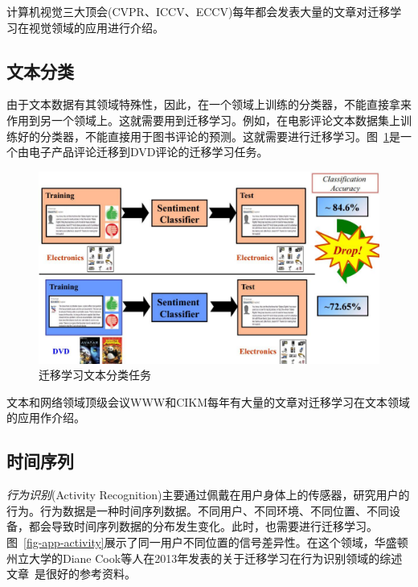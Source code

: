 计算机视觉三大顶会(CVPR、ICCV、ECCV)每年都会发表大量的文章对迁移学习在视觉领域的应用进行介绍。

\subsection{文本分类}

由于文本数据有其领域特殊性，因此，在一个领域上训练的分类器，不能直接拿来作用到另一个领域上。这就需要用到迁移学习。例如，在电影评论文本数据集上训练好的分类器，不能直接用于图书评论的预测。这就需要进行迁移学习。图~\ref{fig-app-text}是一个由电子产品评论迁移到DVD评论的迁移学习任务。

\begin{figure}[htbp]
	\centering
	\includegraphics[scale=0.4]{./figures/fig-app-text.pdf}
	\caption{迁移学习文本分类任务}
	\label{fig-app-text}
\end{figure}

文本和网络领域顶级会议WWW和CIKM每年有大量的文章对迁移学习在文本领域的应用作介绍。

\subsection{时间序列}

\textit{行为识别}(Activity Recognition)主要通过佩戴在用户身体上的传感器，研究用户的行为。行为数据是一种时间序列数据。不同用户、不同环境、不同位置、不同设备，都会导致时间序列数据的分布发生变化。此时，也需要进行迁移学习。图~\ref{fig-app-activity}展示了同一用户不同位置的信号差异性。在这个领域，华盛顿州立大学的Diane Cook等人在2013年发表的关于迁移学习在行为识别领域的综述文章~\cite{cook2013transfer}是很好的参考资料。


